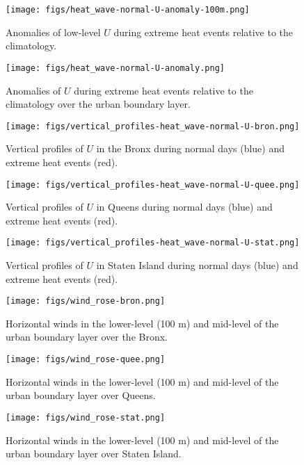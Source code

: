 \documentclass[11pt,a4paper]{article}
\begin{document}
\begin{figure}[ht]
	\centering
	\texttt{[image: figs/heat\_wave-normal-U-anomaly-100m.png]}
	\caption{Anomalies of low-level $U$ during extreme heat events relative to the climatology.}
	\label{fig:extreme-heat-normal-100m-comparison-U}
\end{figure}
\begin{figure}[ht]
	\centering
	\texttt{[image: figs/heat\_wave-normal-U-anomaly.png]}
	\caption{Anomalies of $U$ during extreme heat events relative to the climatology over the urban boundary layer.}
	\label{fig:extreme-heat-normal-comparison-contours-U}
\end{figure}
\begin{figure}[ht]
	\centering
	\texttt{[image: figs/vertical\_profiles-heat\_wave-normal-U-bron.png]}
	\caption{Vertical profiles of $U$ in the Bronx during normal days (blue) and extreme heat events (red).}
	\label{fig:vertical_profiles-heat_wave-normal-U-bron}
\end{figure}
\begin{figure}[ht]
	\centering
	\texttt{[image: figs/vertical\_profiles-heat\_wave-normal-U-quee.png]}
	\caption{Vertical profiles of $U$ in Queens during normal days (blue) and extreme heat events (red).}
	\label{fig:vertical_profiles-heat_wave-normal-U-quee}
\end{figure}
\begin{figure}[ht]
	\centering
	\texttt{[image: figs/vertical\_profiles-heat\_wave-normal-U-stat.png]}
	\caption{Vertical profiles of $U$ in Staten Island during normal days (blue) and extreme heat events (red).}
	\label{fig:vertical_profiles-heat_wave-normal-U-stat}
\end{figure}

\begin{figure}[ht]
	\centering
	\texttt{[image: figs/wind\_rose-bron.png]}
	\caption{Horizontal winds in the lower-level (100 m) and mid-level of the urban boundary layer over the Bronx.}
	\label{fig:wind_rose-bron}
\end{figure}
\begin{figure}[ht]
	\centering
	\texttt{[image: figs/wind\_rose-quee.png]}
	\caption{Horizontal winds in the lower-level (100 m) and mid-level of the urban boundary layer over Queens.}
	\label{fig:wind_rose-quee}
\end{figure}
\begin{figure}[ht]
	\centering
	\texttt{[image: figs/wind\_rose-stat.png]}
	\caption{Horizontal winds in the lower-level (100 m) and mid-level of the urban boundary layer over Staten Island.}
	\label{fig:wind_rose-stat}
\end{figure}
\end{document}
